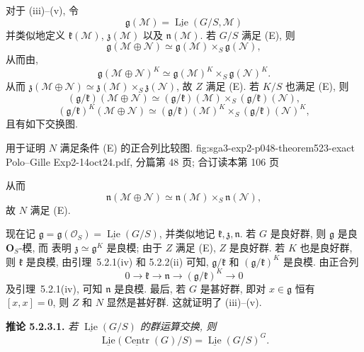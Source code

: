 对于 (iii)--(v), 令
\[
 \mathfrak g(\mathscr M)
   =\underline{\operatorname{Lie}}(G/S,\mathscr M)
\]
并类似地定义 \(\mathfrak k(\mathscr M)\), \(\mathfrak z(\mathscr M)\)
以及 \(\mathfrak n(\mathscr M)\). 若 \(G/S\) 满足 (E), 则
\[
 \mathfrak g(\mathscr M\oplus\mathscr N)
 \simeq\mathfrak g(\mathscr M)\times_S\mathfrak g(\mathscr N),
\]
从而由,
\[
 \mathfrak g(\mathscr M\oplus\mathscr N)^K
 \simeq
 \mathfrak g(\mathscr M)^K\times_S\mathfrak g(\mathscr N)^K.
\]
从而
\(\mathfrak z(\mathscr M\oplus\mathscr N)
\simeq\mathfrak z(\mathscr M)\times_S\mathfrak z(\mathscr N)\), 故
\(Z\) 满足 (E). 若 \(K/S\) 也满足 (E), 则
\[
 (\mathfrak g/\mathfrak k)(\mathscr M\oplus\mathscr N)
 \simeq
 (\mathfrak g/\mathfrak k)(\mathscr M)
 \times_S(\mathfrak g/\mathfrak k)(\mathscr N),
\]
\[
 (\mathfrak g/\mathfrak k)^K(\mathscr M\oplus\mathscr N)
 \simeq
 (\mathfrak g/\mathfrak k)(\mathscr M)^K
 \times_S(\mathfrak g/\mathfrak k)(\mathscr N)^K,
\]
且有如下交换图.

  {用于证明 \(N\) 满足条件 (E) 的正合列比较图.}
  {fig:sga3-exp2-p048-theorem523-exact}
  {Polo--Gille Exp2-14oct24.pdf, 分篇第 48 页;
   合订读本第 106 页}

从而
\[
 \mathfrak n(\mathscr M\oplus\mathscr N)
 \simeq\mathfrak n(\mathscr M)\times_S\mathfrak n(\mathscr N),
\]
故 \(N\) 满足 (E).

现在记
\(\mathfrak g=\mathfrak g(\mathscr O_S)
=\underline{\operatorname{Lie}}(G/S)\), 并类似地记
\(\mathfrak k,\mathfrak z,\mathfrak n\). 若 \(G\) 是良好群, 则
\(\mathfrak g\) 是良 \(\mathbf O_S\)-模, 而
表明 \(\mathfrak z\simeq\mathfrak g^K\) 是良模; 由于 \(Z\) 满足 (E),
\(Z\) 是良好群. 若 \(K\) 也是良好群, 则 \(\mathfrak k\) 是良模,
由引理~5.2.1(iv) 和 5.2.2(ii) 可知,
\(\mathfrak g/\mathfrak k\) 和 \((\mathfrak g/\mathfrak k)^K\) 是良模.
由正合列
\[
 0\longrightarrow\mathfrak k\longrightarrow\mathfrak n
 \longrightarrow(\mathfrak g/\mathfrak k)^K\longrightarrow0
\]
及引理~5.2.1(iv), 可知 \(\mathfrak n\) 是良模. 最后, 若 \(G\) 是甚好群,
即对 \(x\in\mathfrak g\) 恒有 \([x,x]=0\), 则 \(Z\) 和 \(N\) 显然是甚好群.
这就证明了 (iii)--(v).

\medskip
\noindent{}\textbf{推论 5.2.3.1.}
\textit{若 \(\underline{\operatorname{Lie}}(G/S)\) 的群运算交换, 则}
\[
 \underline{\operatorname{Lie}}
   \bigl(\underline{\operatorname{Centr}}(G)/S\bigr)
 =\underline{\operatorname{Lie}}(G/S)^G.
\]


